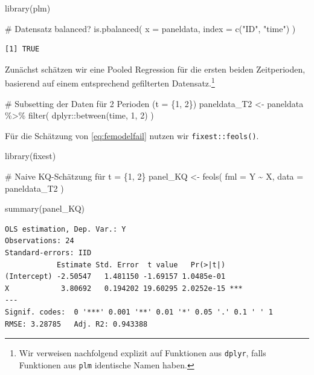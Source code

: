 \documentclass[
  a4paper,
  DIV=11,
  oneside]{scrreprt}
\newenvironment{Shaded}{\begin{snugshade}}{\end{snugshade}}
\newcommand{\AttributeTok}[1]{\textcolor[rgb]{0.40,0.45,0.13}{#1}}
\newcommand{\CommentTok}[1]{\textcolor[rgb]{0.37,0.37,0.37}{#1}}
\newcommand{\DecValTok}[1]{\textcolor[rgb]{0.68,0.00,0.00}{#1}}
\newcommand{\FunctionTok}[1]{\textcolor[rgb]{0.28,0.35,0.67}{#1}}
\newcommand{\NormalTok}[1]{\textcolor[rgb]{0.00,0.23,0.31}{#1}}
\newcommand{\OtherTok}[1]{\textcolor[rgb]{0.00,0.23,0.31}{#1}}
\newcommand{\SpecialCharTok}[1]{\textcolor[rgb]{0.37,0.37,0.37}{#1}}
\newcommand{\StringTok}[1]{\textcolor[rgb]{0.13,0.47,0.30}{#1}}
\begin{document}
\begin{Shaded}
\begin{Highlighting}[]
\FunctionTok{library}\NormalTok{(plm)}

\CommentTok{\# Datensatz balanced?}
\FunctionTok{is.pbalanced}\NormalTok{(}
  \AttributeTok{x =}\NormalTok{ paneldata, }
  \AttributeTok{index =} \FunctionTok{c}\NormalTok{(}\StringTok{"ID"}\NormalTok{, }\StringTok{"time"}\NormalTok{)}
\NormalTok{)}
\end{Highlighting}
\end{Shaded}

\begin{verbatim}
[1] TRUE
\end{verbatim}

Zunächst schätzen wir eine Pooled Regression für die ersten beiden
Zeitperioden, basierend auf einem entsprechend gefilterten
Datensatz.\footnote{Wir verweisen nachfolgend explizit auf Funktionen
  aus \texttt{dplyr}, falls Funktionen aus \texttt{plm} identische Namen
  haben.}

\begin{Shaded}
\begin{Highlighting}[]
\CommentTok{\# Subsetting der Daten für 2 Perioden (t = \{1, 2\})}
\NormalTok{paneldata\_T2 }\OtherTok{\textless{}{-}}\NormalTok{ paneldata }\SpecialCharTok{\%\textgreater{}\%} 
  \FunctionTok{filter}\NormalTok{(}
\NormalTok{    dplyr}\SpecialCharTok{::}\FunctionTok{between}\NormalTok{(time, }\DecValTok{1}\NormalTok{, }\DecValTok{2}\NormalTok{)}
\NormalTok{  )}
\end{Highlighting}
\end{Shaded}

Für die Schätzung von \eqref{eq:femodelfail} nutzen wir
\texttt{fixest::feols()}.

\begin{Shaded}
\begin{Highlighting}[]
\FunctionTok{library}\NormalTok{(fixest)}

\CommentTok{\# Naive KQ{-}Schätzung für t = \{1, 2\}}
\NormalTok{panel\_KQ }\OtherTok{\textless{}{-}} \FunctionTok{feols}\NormalTok{(}
  \AttributeTok{fml =}\NormalTok{ Y }\SpecialCharTok{\textasciitilde{}}\NormalTok{ X, }
  \AttributeTok{data =}\NormalTok{ paneldata\_T2}
\NormalTok{)}

\FunctionTok{summary}\NormalTok{(panel\_KQ)}
\end{Highlighting}
\end{Shaded}

\begin{verbatim}
OLS estimation, Dep. Var.: Y
Observations: 24
Standard-errors: IID 
            Estimate Std. Error  t value   Pr(>|t|)    
(Intercept) -2.50547   1.481150 -1.69157 1.0485e-01    
X            3.80692   0.194202 19.60295 2.0252e-15 ***
---
Signif. codes:  0 '***' 0.001 '**' 0.01 '*' 0.05 '.' 0.1 ' ' 1
RMSE: 3.28785   Adj. R2: 0.943388
\end{verbatim}
\end{document}
